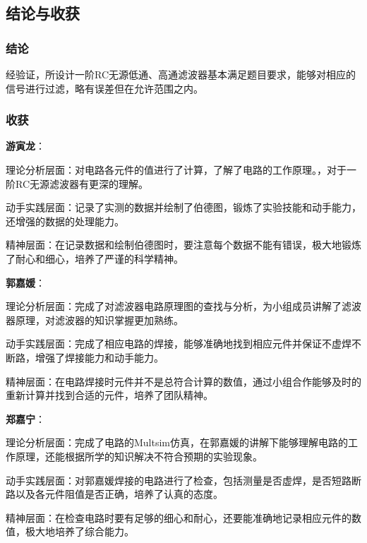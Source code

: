 \documentclass[./测控三级项目.tex]{subfiles} %
\begin{document}
	\subsection{结论与收获}
		\subsubsection{结论}
		经验证，所设计一阶RC无源低通、高通滤波器基本满足题目要求，能够对相应的信号进行过滤，略有误差但在允许范围之内。
		\subsubsection{收获}
		\textbf{游寅龙}：\par
		理论分析层面：对电路各元件的值进行了计算，了解了电路的工作原理。，对于一阶RC无源滤波器有更深的理解。\par
		动手实践层面：记录了实测的数据并绘制了伯德图，锻炼了实验技能和动手能力，还增强的数据的处理能力。\par
		精神层面：在记录数据和绘制伯德图时，要注意每个数据不能有错误，极大地锻炼了耐心和细心，培养了严谨的科学精神。\par
		\textbf{郭嘉媛}：\par
		理论分析层面：完成了对滤波器电路原理图的查找与分析，为小组成员讲解了滤波器原理，对滤波器的知识掌握更加熟练。\par
		动手实践层面：完成了相应电路的焊接，能够准确地找到相应元件并保证不虚焊不断路，增强了焊接能力和动手能力。\par
		精神层面：在电路焊接时元件并不是总符合计算的数值，通过小组合作能够及时的重新计算并找到合适的元件，培养了团队精神。\par
		\textbf{郑嘉宁}：\par
		理论分析层面：完成了电路的Multsim仿真，在郭嘉媛的讲解下能够理解电路的工作原理，还能根据所学的知识解决不符合预期的实验现象。\par
		动手实践层面：对郭嘉媛焊接的电路进行了检查，包括测量是否虚焊，是否短路断路以及各元件阻值是否正确，培养了认真的态度。\par
		精神层面：在检查电路时要有足够的细心和耐心，还要能准确地记录相应元件的数值，极大地培养了综合能力。\par
		
\end{document}
